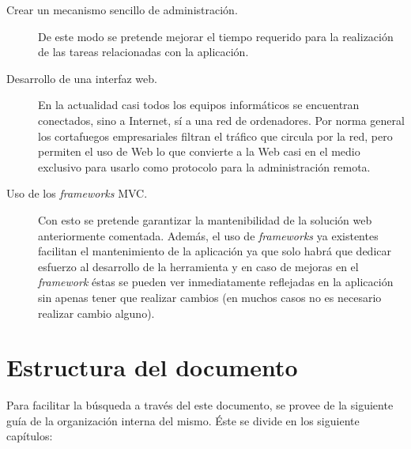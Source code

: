 \begin{description}
	\item[Crear un mecanismo sencillo de administración.] De este modo se pretende mejorar el tiempo requerido para la realización de las tareas relacionadas con la aplicación.
	
	\item[Desarrollo de una interfaz web.] En la actualidad casi todos los equipos informáticos se encuentran conectados, sino a Internet, sí a una red de ordenadores. Por norma general los cortafuegos empresariales filtran el tráfico que circula por la red, pero permiten el uso de Web lo que convierte a la Web casi en el medio exclusivo para usarlo como protocolo para la administración remota.
	
	\item[Uso de los \emph{frameworks} MVC.] Con esto se pretende garantizar la mantenibilidad de la solución web anteriormente comentada. Además, el uso de \emph{frameworks} ya existentes facilitan el mantenimiento de la aplicación ya que solo habrá que dedicar esfuerzo al desarrollo de la herramienta y en caso de mejoras en el \emph{framework} éstas se pueden ver inmediatamente reflejadas en la aplicación sin apenas tener que realizar cambios (en muchos casos no es necesario realizar cambio alguno).
\end{description}


\section{Estructura del documento}

Para facilitar la búsqueda a través del este documento, se provee de la siguiente guía de la organización interna del mismo. Éste se divide en los siguiente capítulos:

